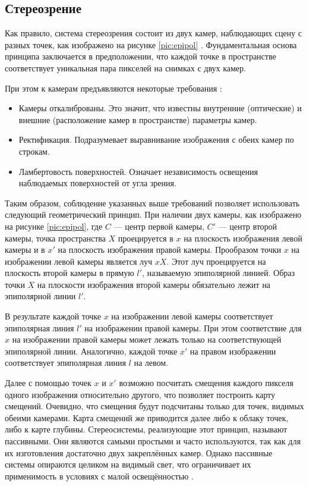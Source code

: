 
\subsection{Стереозрение}
\label{stereovision}
Как правило, система стереозрения состоит из двух камер, наблюдающих сцену с разных точек, как изображено на рисунке \ref{pic:epipol} \cite{Hartley2004}. 
Фундаментальная основа принципа заключается в предположении, что каждой точке в пространстве соответствует уникальная пара пикселей на снимках с двух камер.  

При этом к камерам предъявляются некоторые требования \cite{rusoverview}:   %
\begin{itemize}
	\item Камеры откалиброваны. Это значит, что известны внутренние (оптические) и внешние (расположение камер в пространстве) параметры камер. 
	\item Ректификация. Подразумевает выравнивание изображения с обеих камер по строкам.  %
	\item Ламбертовость поверхностей. Означает независимость освещения наблюдаемых поверхностей от угла зрения. 
\end{itemize}

Таким образом, соблюдение указанных выше требований позволяет использовать следующий геометрический принцип. При наличии двух камеры, как изображено 
на рисунке \ref{pic:epipol}, где $C$ — центр первой камеры, $C'$ — центр второй камеры, точка пространства $X$  
проецируется в $x$ на плоскость изображения левой камеры и в $x'$ на плоскость изображения правой камеры. Прообразом точки $x$ на изображении левой 
камеры является луч $xX$. Этот луч проецируется на плоскость второй камеры в прямую $l'$, называемую эпиполярной линией. Образ точки $X$ на плоскости 
изображения второй камеры обязательно лежит на эпиполярной линии $l'$.


В результате каждой точке $x$ на изображении левой камеры соответствует эпиполярная линия $l'$ на изображении правой камеры. При этом соответствие для $x$ на 
изображении правой камеры может лежать только на соответствующей эпиполярной линии. Аналогично, каждой точке $x'$ на правом изображении соответствует 
эпиполярная линия $l$ на левом. 


Далее с помощью точек $x$ и $x'$ возможно посчитать смещения каждого пикселя одного изображения относительно другого, что позволяет построить карту смещений. 
Очевидно, что смещения будут подсчитаны только для точек, видимых обеими камерами. Карта смещений же приводится далее либо к облаку точек, либо к карте глубины. 
Стереосистемы, реализующие этот принцип, называют пассивными. Они являются самыми простыми и часто используются, так как для их изготовления достаточно 
двух закреплённых камер. Однако пассивные системы опираются целиком на видимый свет, что ограничивает их применимость в условиях с малой освещённостью \cite{find:passive_perfomance}. 

